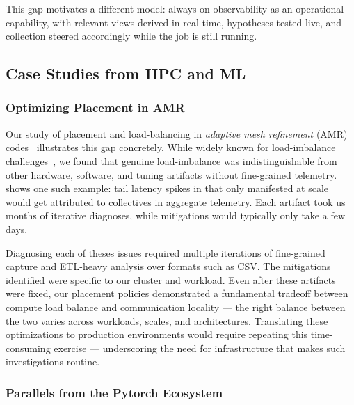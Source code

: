 This gap motivates a different model: always-on observability as an operational capability, with
relevant views derived in real-time, hypotheses tested live, and collection steered accordingly
while the job is still running.

\subsection{Case Studies from HPC and ML}
\subsubsection{Optimizing Placement in AMR}
\figBgVolatile{}

Our study of placement and load-balancing in \emph{adaptive mesh refinement} (AMR)
codes~\cite{Jain2025:AMR} illustrates this gap concretely.
While widely known for load-imbalance challenges~\cite{Dubey2014:Survey}, we found that genuine
load-imbalance was indistinguishable from other hardware, software, and tuning artifacts without
fine-grained telemetry.
 shows one such example: tail latency spikes in \mpiw{}
that only manifested at scale would get attributed to collectives in aggregate telemetry.
Each artifact took us months of iterative diagnoses, while mitigations would typically only take a
few days.

Diagnosing each of theses issues required multiple iterations of fine-grained capture and ETL-heavy
analysis over formats such as CSV.
The mitigations identified were specific to our cluster and workload.
Even after these artifacts were fixed, our placement policies demonstrated a fundamental tradeoff
between compute load balance and communication locality --- the right balance between the two
varies across workloads, scales, and architectures.
Translating these optimizations to production environments would require repeating this
time-consuming exercise --- underscoring the need for infrastructure that makes such investigations
routine.

\subsubsection{Parallels from the Pytorch Ecosystem}

